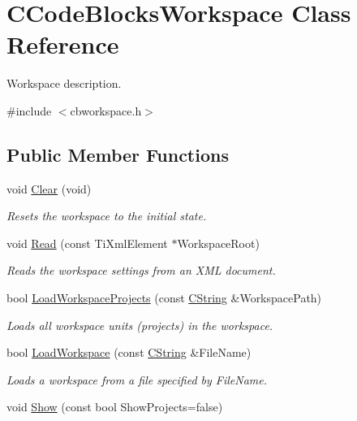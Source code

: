 \hypertarget{classCCodeBlocksWorkspace}{\section{C\-Code\-Blocks\-Workspace Class Reference}
\label{classCCodeBlocksWorkspace}
}


Workspace description.  




{\ttfamily \#include $<$cbworkspace.\-h$>$}

\subsection*{Public Member Functions}
\begin{DoxyCompactItemize}
\item 
void \hyperlink{classCCodeBlocksWorkspace_ab3fd3af0485cacef0644ddcab5d7e162}{Clear} (void)
\begin{DoxyCompactList}\small\item\em Resets the workspace to the initial state. \end{DoxyCompactList}\item 
void \hyperlink{classCCodeBlocksWorkspace_a42ce65be75b14721a7467133705f49d0}{Read} (const Ti\-Xml\-Element $\ast$Workspace\-Root)
\begin{DoxyCompactList}\small\item\em Reads the workspace settings from an X\-M\-L document. \end{DoxyCompactList}\item 
bool \hyperlink{classCCodeBlocksWorkspace_ad152d19f3596ea14a286348db0a1cfbc}{Load\-Workspace\-Projects} (const \hyperlink{classCString}{C\-String} \&Workspace\-Path)
\begin{DoxyCompactList}\small\item\em Loads all workspace units (projects) in the workspace. \end{DoxyCompactList}\item 
bool \hyperlink{classCCodeBlocksWorkspace_a963cd06ba0427bca3dcef2e4281b2c69}{Load\-Workspace} (const \hyperlink{classCString}{C\-String} \&File\-Name)
\begin{DoxyCompactList}\small\item\em Loads a workspace from a file specified by {\itshape File\-Name}. \end{DoxyCompactList}\item 
void \hyperlink{classCCodeBlocksWorkspace_ac85196730e4c07db6e910034bb2600f7}{Show} (const bool Show\-Projects=false)

\end{DoxyCompactItemize}
